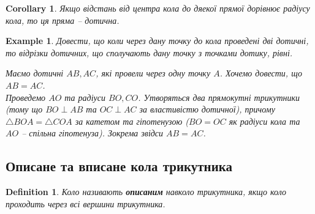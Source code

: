 \documentclass[a4paper, 10pt]{article}
\theoremstyle{theoremdd}
\theoremstyle{theoremdd}
\theoremstyle{theoremdd}
\newtheorem{definition}[theorem]{Definition}
\theoremstyle{theoremdd}
\theoremstyle{theoremdd}
\newtheorem{example}[theorem]{Example}
\theoremstyle{theoremdd}
\theoremstyle{theoremdd}
\theoremstyle{theoremdd}
\theoremstyle{theoremdd}
\newtheorem{corollary}[theorem]{Corollary}
\begin{document}
\begin{corollary}
Якщо відстань від центра кола до дяекої прямої дорівнює радіусу кола, то ця пряма -- дотична.
\end{corollary}

\begin{example}
\label{clown_hat}
Довести, що коли через дану точку до кола проведені дві дотичні, то відрізки дотичних, що сполучають дану точку з точками дотику, рівні.
\begin{figure}[H]
\centering
{}
\end{figure}
Маємо дотичні $AB,AC$, які провели через одну точку $A$. Хочемо довести, що $AB = AC$.\\
Проведемо $AO$ та радіуси $BO,CO$. Утворяться два прямокутні трикутники (тому що $BO \perp AB$ та $OC \perp AC$ за властивістю дотичної), причому $\triangle BOA = \triangle COA$ за катетом та гіпотенузою ($BO = OC$ як радіуси кола та $AO$ -- спільна гіпотенуза). Зокрема звідси $AB = AC$.
\end{example}

\subsection{Описане та вписане кола трикутника}
\begin{definition}
Коло називають \textbf{описаним} навколо трикутника, якщо коло проходить через всі вершини трикутника.
\begin{figure}[H]
\centering
{}
\end{figure}
\end{definition}
\end{document}
